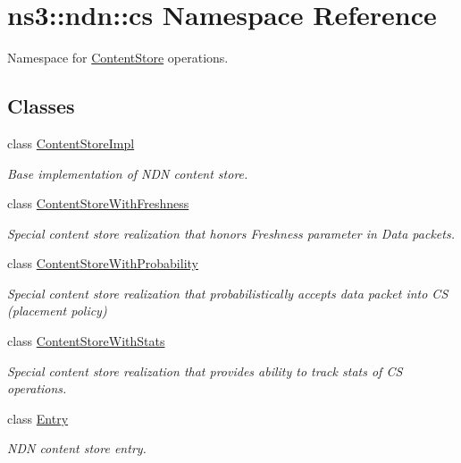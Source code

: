 \hypertarget{namespacens3_1_1ndn_1_1cs}{}\section{ns3\+:\+:ndn\+:\+:cs Namespace Reference}
\label{namespacens3_1_1ndn_1_1cs}


Namespace for \hyperlink{classns3_1_1ndn_1_1ContentStore}{Content\+Store} operations.  


\subsection*{Classes}
\begin{DoxyCompactItemize}
\item 
class \hyperlink{classns3_1_1ndn_1_1cs_1_1ContentStoreImpl}{Content\+Store\+Impl}
\begin{DoxyCompactList}\small\item\em Base implementation of N\+DN content store. \end{DoxyCompactList}\item 
class \hyperlink{classns3_1_1ndn_1_1cs_1_1ContentStoreWithFreshness}{Content\+Store\+With\+Freshness}
\begin{DoxyCompactList}\small\item\em Special content store realization that honors Freshness parameter in Data packets. \end{DoxyCompactList}\item 
class \hyperlink{classns3_1_1ndn_1_1cs_1_1ContentStoreWithProbability}{Content\+Store\+With\+Probability}
\begin{DoxyCompactList}\small\item\em Special content store realization that probabilistically accepts data packet into CS (placement policy) \end{DoxyCompactList}\item 
class \hyperlink{classns3_1_1ndn_1_1cs_1_1ContentStoreWithStats}{Content\+Store\+With\+Stats}
\begin{DoxyCompactList}\small\item\em Special content store realization that provides ability to track stats of CS operations. \end{DoxyCompactList}\item 
class \hyperlink{classns3_1_1ndn_1_1cs_1_1Entry}{Entry}
\begin{DoxyCompactList}\small\item\em N\+DN content store entry. \end{DoxyCompactList}\item 

\end{DoxyCompactItemize}
